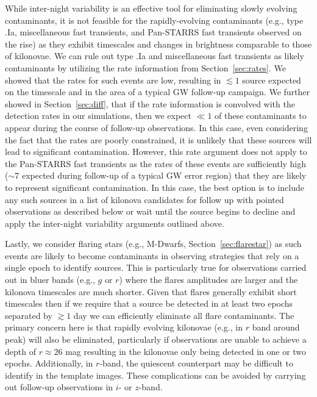 While inter-night variability is an effective tool for eliminating slowly evolving contaminants, it is not feasible for the rapidly-evolving contaminants (e.g., type .Ia, miscellaneous fast transients, and Pan-STARRS fast transients observed on the rise) as they exhibit timescales and changes in brightness comparable to those of kilonovae. We can rule out type .Ia and miscellaneous fast transients as likely contaminants by utilizing the rate information from Section~\ref{sec:rates}. We showed that the rates for such events are low, resulting in $\lesssim1$ source expected on the timescale and in the area of a typical GW follow-up campaign. We further showed in Section~\ref{sec:diff}, that if the rate information is convolved with the detection rates in our simulations, then we expect $\ll 1$ of these contaminants to appear during the course of follow-up observations. In this case, even considering the fact that the rates are poorly constrained, it is unlikely that these sources will lead to significant contamination. However, this rate argument does not apply to the Pan-STARRS fast transients as the rates of these events are sufficiently high ($\sim 7$ expected during follow-up of a typical GW error region) that they are likely to represent significant contamination. In this case, the best option is to include any such sources in a list of kilonova candidates for follow up with pointed observations as described below or wait until the source begins to decline and apply the inter-night variability arguments outlined above. 

Lastly, we consider flaring stars (e.g., M-Dwarfs, Section~\ref{sec:flarestar}) as such events are likely to become contaminants in observing strategies that rely on a single epoch to identify sources. This is particularly true for observations carried out in bluer bands (e.g., $g$ or $r$) where the flares amplitudes are larger and the kilonova timescales are much shorter. Given that flares generally exhibit short timescales \citep[minutes to hours][]{Berger+13} then if we require that a source be detected in at least two epochs separated by $\gtrsim1$ day we can efficiently eliminate all flare contaminants. The primary concern here is that rapidly evolving kilonovae (e.g., in $r$ band around peak) will also be eliminated, particularly if observations are unable to achieve a depth of $r\approx26$ mag resulting in the kilonovae only being detected in one or two epochs. Additionally, in $r$-band, the quiescent counterpart may be difficult to identify in the template images. These complications can be avoided by carrying out follow-up observations in $i$- or $z$-band.

